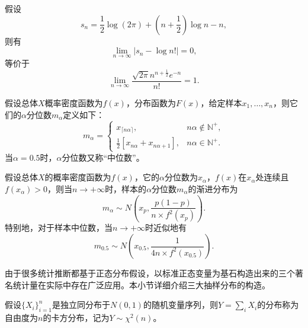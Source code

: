 \begin{theorem}[斯特林近似]
假设
\begin{equation}
    s_n = \frac{1}{2} \log(2\pi) + (n+\frac{1}{2}) \log n - n,
\end{equation}
则有
\begin{equation}
    \lim\limits_{n\rightarrow \infty} |s_n - \log n!| = 0,
\end{equation}
等价于
\begin{equation}
    \lim\limits_{n\rightarrow \infty} \frac{\sqrt{2\pi} n^{n + \frac{1}{2}} e^{-n}}{n!} = 1.
\end{equation}
\end{theorem}

\begin{definition}[样本分位数与中位数]
假设总体$X$概率密度函数为$f(x)$，分布函数为$F(x)$，给定样本$x_1,\ldots,x_n$，则它们的$\alpha$分位数$m_\alpha$定义如下：
\begin{equation}
m_\alpha = \left\{
    \begin{array}{rl}
        x_{\lceil n\alpha \rceil}, & n\alpha\notin \mathbb N^+,\\
        \frac{1}{2} [x_{n\alpha} + x_{n\alpha + 1}], & n\alpha\in \mathbb N^+.
    \end{array}
\right.
\end{equation}
当$\alpha=0.5$时，$\alpha$分位数又称“中位数”。
\end{definition}

\begin{theorem}
假设总体$X$的概率密度函数为$f(x)$，它的$\alpha$分位数为$x_\alpha$，$f(x)$在$x_\alpha$处连续且$f(x_\alpha)>0$，则当$n\rightarrow +\infty$时，样本的$\alpha$分位数$m_\alpha$的渐进分布为
\begin{equation}
    m_\alpha \sim N(x_p, \frac{p(1-p)}{n\times f^2(x_p)}).
\end{equation}
特别地，对于样本中位数，当$n\rightarrow +\infty$时近似地有
\begin{equation}
    m_{0.5} \sim N(x_{0.5}, \frac{1}{4n\times f^2(x_{0.5})}).
\end{equation}
\end{theorem}

由于很多统计推断都基于正态分布假设，以标准正态变量为基石构造出来的三个著名统计量在实际中存在广泛应用。本小节详细介绍三大抽样分布的构造。
\begin{definition}[卡方分布]
假设$\{X_i\}_{i=1}^n$是独立同分布于$N(0,1)$的随机变量序列，则$Y=\sum\limits_i X_i$的分布称为自由度为$n$的卡方分布，记为$Y\sim\chi^2(n)$。
\end{definition}

